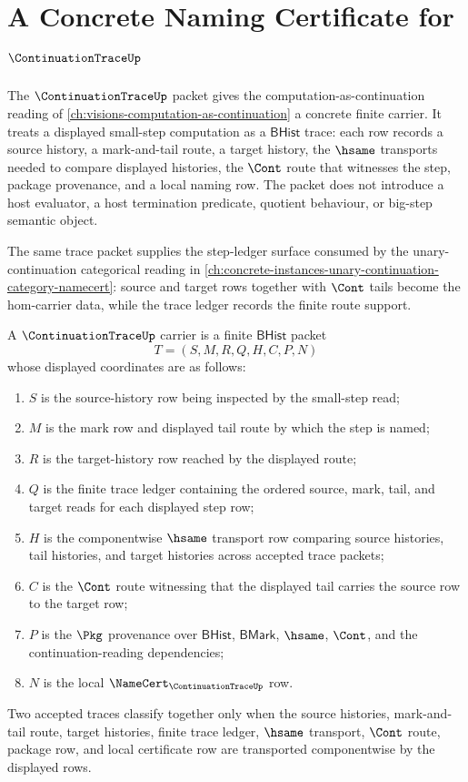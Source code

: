 \chapter{A Concrete Naming Certificate for $\ContinuationTraceUp$}
\label{ch:concrete-instances-continuationtrace-namecert}

The $\ContinuationTraceUp$ packet gives the computation-as-continuation reading of \autoref{ch:visions-computation-as-continuation} a concrete finite carrier. It treats a displayed small-step computation as a $\mathsf{BHist}$ trace: each row records a source history, a mark-and-tail route, a target history, the $\hsame$ transports needed to compare displayed histories, the $\Cont$ route that witnesses the step, package provenance, and a local naming row. The packet does not introduce a host evaluator, a host termination predicate, quotient behaviour, or big-step semantic object.

The same trace packet supplies the step-ledger surface consumed by the unary-continuation categorical reading in \autoref{ch:concrete-instances-unary-continuation-category-namecert}: source and target rows together with $\Cont$ tails become the hom-carrier data, while the trace ledger records the finite route support.

\begin{definition}
\label{def:continuation-trace-carrier}
A $\ContinuationTraceUp$ carrier is a finite $\mathsf{BHist}$ packet
$$
T=(S,M,R,Q,H,C,P,N)
$$
whose displayed coordinates are as follows:
\begin{enumerate}
\item $S$ is the source-history row being inspected by the small-step read;
\item $M$ is the mark row and displayed tail route by which the step is named;
\item $R$ is the target-history row reached by the displayed route;
\item $Q$ is the finite trace ledger containing the ordered source, mark, tail, and target reads for each displayed step row;
\item $H$ is the componentwise $\hsame$ transport row comparing source histories, tail histories, and target histories across accepted trace packets;
\item $C$ is the $\Cont$ route witnessing that the displayed tail carries the source row to the target row;
\item $P$ is the $\Pkg$ provenance over $\mathsf{BHist}$, $\mathsf{BMark}$, $\hsame$, $\Cont$, and the continuation-reading dependencies;
\item $N$ is the local $\NameCert_{\ContinuationTraceUp}$ row.
\end{enumerate}
Two accepted traces classify together only when the source histories, mark-and-tail route, target histories, finite trace ledger, $\hsame$ transport, $\Cont$ route, package row, and local certificate row are transported componentwise by the displayed rows.
\end{definition}

